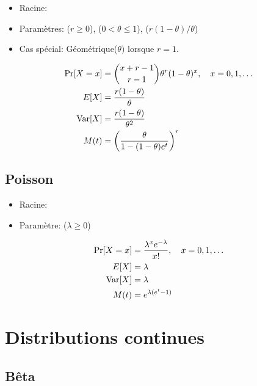 \begin{itemize}
\item Racine: 
\item Paramètres:  ($r \geq 0$),
   ($0 < \theta \leq 1$),
   ($r(1 - \theta)/\theta$)
\end{itemize}
\begin{itemize}
\item Cas spécial: Géométrique($\theta)$ lorsque $r = 1$.
\end{itemize}
\begin{align*}
  \Pr[X = x]
  &= \binom{x + r - 1}{r - 1} \theta^r (1 - \theta)^x, \quad
  x = 0, 1, \dots \\
  E [ X ]
  &= \frac{r (1 - \theta)}{\theta} \\
  \operatorname{Var} [ X ]
  &= \frac{r (1 - \theta)}{\theta^2} \\
  M(t)
  &= \left( \frac{\theta}{1 - (1 - \theta)e^t} \right)^r
\end{align*}

\subsection{Poisson}
\label{sec:distributions:poisson}

\begin{itemize}
\item Racine: 
\item Paramètre:  ($\lambda \geq 0$)
\end{itemize}
\begin{align*}
  \Pr[X = x]
  &= \frac{\lambda^x e^{-\lambda}}{x!}, \quad x = 0, 1, \dots \\
  E [ X ]
  &= \lambda \\
  \operatorname{Var} [ X ]
  &= \lambda \\
  M(t)
  &= e^{\lambda (e^t - 1)}
\end{align*}


\section{Distributions continues}

\subsection{Bêta}
\label{sec:distributions:beta}

